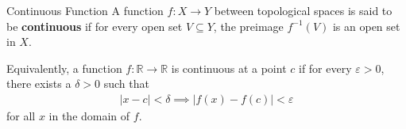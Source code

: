 \documentclass{article}
\begin{document}
\begin{definition}{Continuous Function}
    A function $f: X \rightarrow Y$ between topological spaces is said to be \textbf{continuous} if for every open set $V \subseteq Y$, the preimage $f^{-1}(V)$ is an open set in $X$.

    Equivalently, a function $f: \mathbb{R} \rightarrow \mathbb{R}$ is continuous at a point $c$ if for every $\varepsilon > 0$, there exists a $\delta > 0$ such that
    \begin{align}
        |x - c| < \delta \implies |f(x) - f(c)| < \varepsilon
    \end{align}
    for all $x$ in the domain of $f$.
\end{definition}
\end{document}
